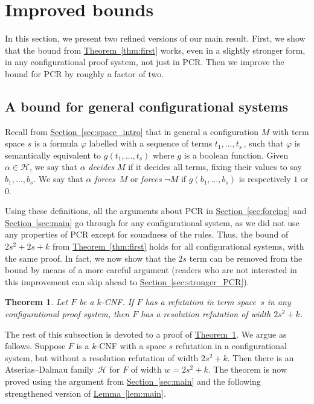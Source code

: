 \documentclass[11pt]{article}
\numberwithin{equation}{section}
\newtheorem{theorem}{Theorem}[section]
\theoremstyle{definition}
\theoremstyle{plain}
\newcommand{\expref}[2]{\hyperref[#2]{#1~\ref{#2}}}
\newcommand\calH{\mathcal{H}}
\let\phi\varphi
\begin{document}
%
\section{Improved bounds}\label{sec:refinements}
%

In this section, we present two refined versions of our main result. 
First, we show that the bound from \expref{Theorem}{thm:first} 
works, even in a slightly stronger form,
in any configurational proof system, not just in PCR.
Then we improve the bound for PCR by roughly a factor of two.


\subsection{A bound for general configurational systems}

Recall from \expref{Section}{sec:space_intro} that in general
 a configuration $M$ with term space $s$ is a formula $\phi$ labelled
with a sequence of terms $t_1, \dots, t_s$\,,
such that $\phi$ is semantically equivalent to $g(t_1, \dots, t_s)$ 
where $g$ is a boolean function. Given $\alpha \in \calH$,
we say that $\alpha$ \emph{decides} $M$ if it decides all terms,
fixing their values to say $b_1, \dots, b_s$.
We say that $\alpha$ \emph{forces}~$M$ or \emph{forces} $\neg M$
 if $g(b_1, \dots, b_s)$ is respectively $1$ or $0$.
 
Using these definitions, all the arguments about PCR  in 
\expref{Section}{sec:forcing} and \expref{Section}{sec:main}
go through for any configurational system, 
as we did not use any properties of PCR except for soundness of the rules. 
Thus, the bound of $2s^2 + 2s  + k$ from \expref{Theorem}{thm:first} holds for all configurational systems, with the same proof.
In fact, we now show that the $2s$ term can be removed from the bound by means
of a more careful argument
(readers who are not interested in this improvement 
can skip ahead to \expref{Section}{sec:stronger_PCR}).

\begin{theorem} \label{the:configurational_bound}
Let $F$ be a $k$-CNF. If $F$ has a refutation in term space~$s$
in any configurational proof system, then $F$
has a resolution refutation of width $2s^2 + k$.
\end{theorem}



The rest of this subsection is devoted to a proof of \expref{Theorem}{the:configurational_bound}. 
We argue as follows. Suppose $F$ is a $k$-CNF with a space $s$ refutation in a configurational
system, but without a resolution refutation of width $2s^2+k$.
Then there is an Atserias--Dalmau family~$\calH$ for $F$ of width $w = 2s^2+k$.
The theorem is now proved using the argument from 
\expref{Section}{sec:main}
and the following strengthened version of \expref{Lemma}{lem:main}.
\end{document}
